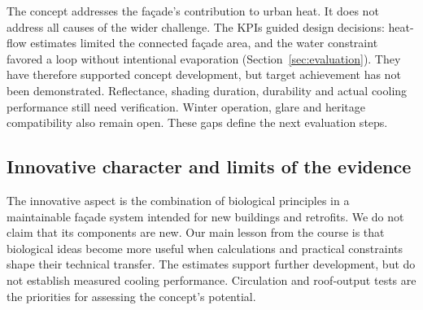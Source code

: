 The concept addresses the façade's contribution to urban heat. It does not address all
causes of the wider challenge. The KPIs guided design decisions: heat-flow estimates
limited the connected façade area, and the water constraint favored a loop without
intentional evaporation (Section~\ref{sec:evaluation}). They have therefore supported
concept development, but target achievement has not been demonstrated. Reflectance,
shading duration, durability and actual cooling performance still need verification.
Winter operation, glare and heritage compatibility also remain open. These gaps define
the next evaluation steps.

\subsection{Innovative character and limits of the evidence}
\label{sec:innovation}

The innovative aspect is the combination of biological principles in a maintainable
façade system intended for new buildings and retrofits. We do not claim that its
components are new. Our main lesson from the course is that biological ideas become more
useful when calculations and practical constraints shape their technical transfer. The
estimates support further development, but do not establish measured cooling performance.
Circulation and roof-output tests are the priorities for assessing the concept's
potential.
